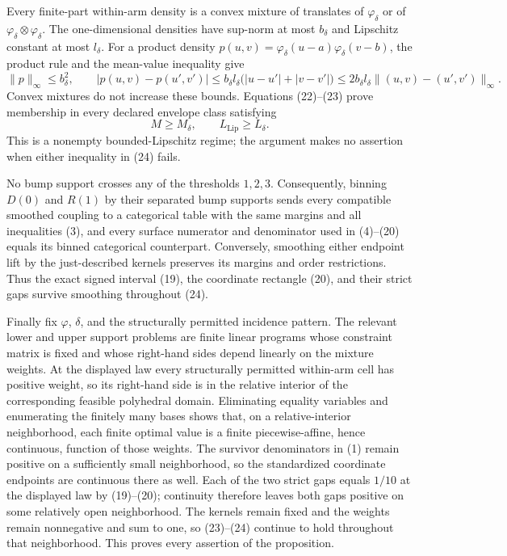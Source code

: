 Every finite-part within-arm density is a convex mixture of translates of \(\varphi_\delta\) or of \(\varphi_\delta\otimes\varphi_\delta\).  The one-dimensional densities have sup-norm at most \(b_\delta\) and Lipschitz constant at most \(l_\delta\).  For a product density \(p(u,v)=\varphi_\delta(u-a)\varphi_\delta(v-b)\), the product rule and the mean-value inequality give
\[
 \|p\|_\infty\leq b_\delta^2,\qquad
 |p(u,v)-p(u',v')|
 \leq b_\delta l_\delta\bigl(|u-u'|+|v-v'|\bigr)
 \leq2b_\delta l_\delta\|(u,v)-(u',v')\|_\infty. \tag{23}
\]
Convex mixtures do not increase these bounds.  Equations (22)--(23) prove membership in every declared envelope class satisfying
\[
 M\geq M_\delta,\qquad L_{\mathrm{Lip}}\geq L_\delta. \tag{24}
\]
This is a nonempty bounded-Lipschitz regime; the argument makes no assertion when either inequality in (24) fails.

No bump support crosses any of the thresholds \(1,2,3\).  Consequently, binning \(D(0)\) and \(R(1)\) by their separated bump supports sends every compatible smoothed coupling to a categorical table with the same margins and all inequalities (3), and every surface numerator and denominator used in (4)--(20) equals its binned categorical counterpart.  Conversely, smoothing either endpoint lift by the just-described kernels preserves its margins and order restrictions.  Thus the exact signed interval (19), the coordinate rectangle (20), and their strict gaps survive smoothing throughout (24).

Finally fix \(\varphi\), \(\delta\), and the structurally permitted incidence pattern.  The relevant lower and upper support problems are finite linear programs whose constraint matrix is fixed and whose right-hand sides depend linearly on the mixture weights.  At the displayed law every structurally permitted within-arm cell has positive weight, so its right-hand side is in the relative interior of the corresponding feasible polyhedral domain.  Eliminating equality variables and enumerating the finitely many bases shows that, on a relative-interior neighborhood, each finite optimal value is a finite piecewise-affine, hence continuous, function of those weights.  The survivor denominators in (1) remain positive on a sufficiently small neighborhood, so the standardized coordinate endpoints are continuous there as well.  Each of the two strict gaps equals \(1/10\) at the displayed law by (19)--(20); continuity therefore leaves both gaps positive on some relatively open neighborhood.  The kernels remain fixed and the weights remain nonnegative and sum to one, so (23)--(24) continue to hold throughout that neighborhood.  This proves every assertion of the proposition.

